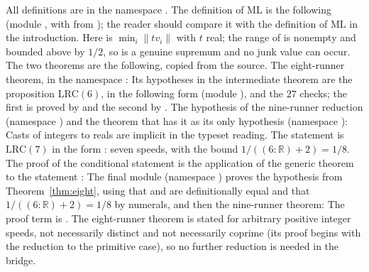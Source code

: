 \documentclass[11pt]{article}
\theoremstyle{remark}
\newcommand{\ML}{\mathrm{ML}}
\newcommand{\R}{\mathbb{R}}
\newcommand{\dist}[1]{\lVert #1\rVert}
\begin{document}
All definitions are in the namespace . The definition of $\ML$ is the following (module , with  from ); the reader should compare it with the definition of $\ML$ in the introduction. Here  is $\min_i\dist{tv_i}$ with $t$ real; the range of  is nonempty and bounded above by $1/2$, so  is a genuine supremum and no junk value can occur.
The two theorems are the following, copied from the source. The eight-runner theorem, in the namespace :
Its hypotheses in the intermediate theorem  are the proposition $\mathrm{LRC}(6)$, in the following form (module ), and the $27$ checks; the first is proved by  and the second by .
The hypothesis of the nine-runner reduction (namespace ) and the theorem that has it as its only hypothesis (namespace ):
Casts of integers to reals are implicit in the typeset reading. The statement  is $\mathrm{LRC}(7)$ in the form : seven speeds, with the bound $1/((6:\R)+2)=1/8$. The proof of the conditional statement is the application of the generic theorem  to the statement :
The final module  (namespace ) proves the hypothesis from Theorem~\ref{thm:eight}, using that  and  are definitionally equal and that $1/((6:\R)+2)=1/8$ by numerals, and then the nine-runner theorem:
The proof term is . The eight-runner theorem is stated for arbitrary positive integer speeds, not necessarily distinct and not necessarily coprime (its proof begins with the reduction to the primitive case), so no further reduction is needed in the bridge.
\end{document}
